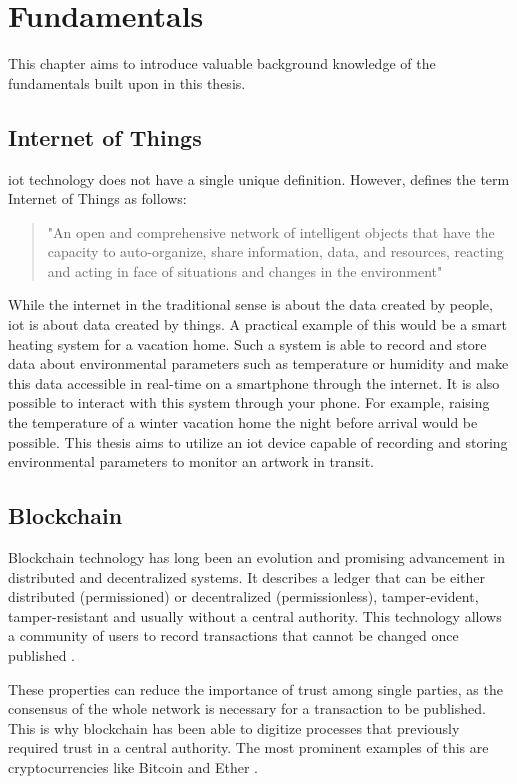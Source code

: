 \chapter{Fundamentals}
\label{chap:technologies}
This chapter aims to introduce valuable background knowledge of the fundamentals built upon in this thesis.

\section{Internet of Things}
\gls{iot} technology does not have a single unique definition. However, \textcite[p. 165]{iot} defines the term Internet of Things as follows:
\begin{quote}
    "An open and comprehensive network of intelligent objects that have the capacity to auto-organize, share information, data, and resources, reacting and acting in face of situations and changes in the environment"
\end{quote}
While the internet in the traditional sense is about the data created by people, \gls{iot} is about data created by things. A practical example of this would be a smart heating system for a vacation home. Such a system is able to record and store data about environmental parameters such as temperature or humidity and make this data accessible in real-time on a smartphone through the internet. It is also possible to interact with this system through your phone. For example, raising the temperature of a winter vacation home the night before arrival would be possible. This thesis aims to utilize an \gls{iot} device capable of recording and storing environmental parameters to monitor an artwork in transit.

\section{Blockchain}
Blockchain technology has long been an evolution and promising advancement in distributed and decentralized systems. It describes a ledger that can be either distributed (permissioned) or decentralized (permissionless), tamper-evident, tamper-resistant and usually without a central authority. This technology allows a community of users to record transactions that cannot be changed once published \parencite{blockchainoverview}.

These properties can reduce the importance of trust among single parties, as the consensus of the whole network is necessary for a transaction to be published. This is why blockchain has been able to digitize processes that previously required trust in a central authority. The most prominent examples of this are cryptocurrencies like Bitcoin \cite{bitcoin} and Ether \cite{ethereum}.

